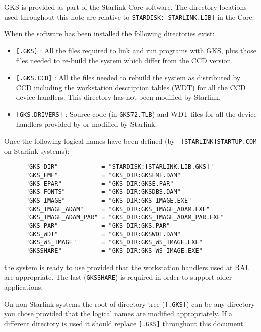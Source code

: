 GKS is provided as part of the Starlink Core software. The directory locations
used throughout this note are relative to {\tt STARDISK:[STARLINK.LIB]} in the
Core.

When the software has been installed the following directories exist:

\begin{itemize}

\item {\tt [.GKS]} :
All the files required to link and run programs with GKS, plus those files
needed to re-build the system which differ from the CCD version.

\item {\tt [.GKS.CCD]} :
All the files needed to rebuild the system as distributed by CCD including the
workstation description tables (WDT) for all the CCD device handlers.
This directory has not been modified by Starlink.

\item {\tt [GKS.DRIVERS]} :
Source code (in {\tt GKS72.TLB}) and WDT files for all the device handlers
provided by or modified by Starlink.

\end{itemize}

Once the following logical names have been defined (by {\tt
[STARLINK]STARTUP.COM} on Starlink systems):

\begin{verbatim}
      "GKS_DIR"            = "STARDISK:[STARLINK.LIB.GKS]"
      "GKS_EMF"            = "GKS_DIR:GKSEMF.DAM"
      "GKS_EPAR"           = "GKS_DIR:GKSE.PAR"
      "GKS_FONTS"          = "GKS_DIR:GKSDBS.DAM"
      "GKS_IMAGE"          = "GKS_DIR:GKS_IMAGE.EXE"
      "GKS_IMAGE_ADAM"     = "GKS_DIR:GKS_IMAGE_ADAM.EXE"
      "GKS_IMAGE_ADAM_PAR" = "GKS_DIR:GKS_IMAGE_ADAM_PAR.EXE"
      "GKS_PAR"            = "GKS_DIR:GKS.PAR"
      "GKS_WDT"            = "GKS_DIR:GKSWDT.DAM"
      "GKS_WS_IMAGE"       = "GKS_DIR:GKS_WS_IMAGE.EXE"
      "GKSSHARE"           = "GKS_DIR:GKS_WS_IMAGE.EXE"
\end{verbatim}

the system is ready to use provided that the workstation handlers used at RAL
are appropriate. The last ({\tt GKSSHARE}) is required in order to support older
applications.

On non-Starlink systems the root of directory tree ({\tt [.GKS]}) can be
any directory you chose provided that the logical names are modified
appropriately.
If a different directory is used it should replace {\tt [.GKS]} throughout
this document.

